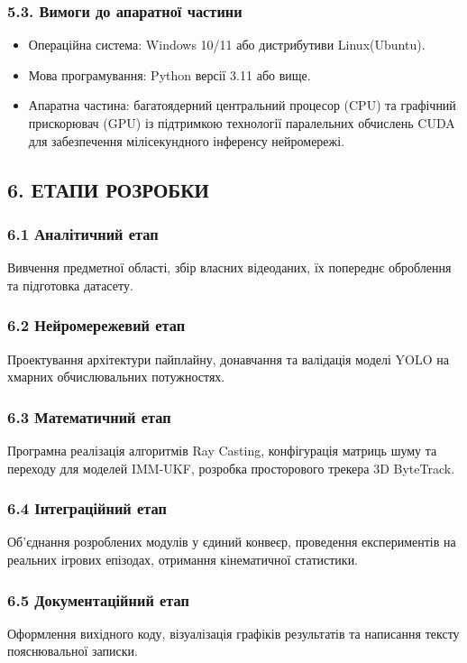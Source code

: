 \begin{unnumbered}
\subsubsection{5.3. Вимоги до апаратної частини}

\begin{itemize}
    \item Операційна система: Windows 10/11 або дистрибутиви Linux(Ubuntu).
    \item Мова програмування: Python версії 3.11 або вище.
    \item Апаратна частина: багатоядерний центральний процесор (CPU) та графічний прискорювач (GPU) із підтримкою
    технології паралельних обчислень CUDA для забезпечення мілісекундного інференсу нейромережі.
\end{itemize}

\subsection{6. ЕТАПИ РОЗРОБКИ}
\subsubsection{6.1 Аналітичний етап}
Вивчення предметної області, збір власних відеоданих, їх попереднє оброблення та підготовка датасету.
\subsubsection{6.2 Нейромережевий етап}
Проектування архітектури пайплайну, донавчання та валідація моделі \gls{YOLO} на хмарних обчислювальних потужностях.
\subsubsection{6.3 Математичний етап}
Програмна реалізація алгоритмів Ray Casting, конфігурація матриць шуму та переходу для моделей \gls{IMM}-\gls{UKF},
розробка просторового трекера 3D ByteTrack.
\subsubsection{6.4 Інтеграційний етап}
Об'єднання розроблених модулів у єдиний конвеєр, проведення експериментів на реальних ігрових епізодах, отримання
кінематичної статистики.
\subsubsection{6.5 Документаційний етап}
Оформлення вихідного коду, візуалізація графіків результатів та написання тексту пояснювальної записки.

\end{unnumbered}
